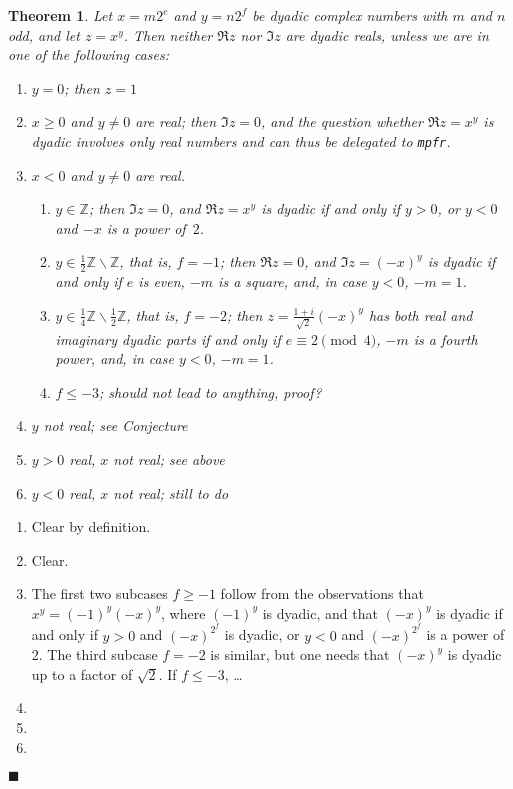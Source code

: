 \documentclass {article}
\newcommand {\mpfr}{{\tt mpfr}}
\newcommand {\Z}{\mathbb Z}
\newtheorem{theorem}{Theorem}
\newenvironment{proof}{\noindent{\bf Proof:}}{{\hspace* {\fill}$\blacksquare$}}
\begin{document}
\begin {theorem}
Let $x = m 2^e$ and $y = n 2^f$ be dyadic complex numbers with $m$ and $n$ odd,
and let $z = x^y$. Then neither $\Re z$ nor $\Im z$ are dyadic reals,
unless we are in one of the following cases:
\begin {enumerate}
\item
$y = 0$; then $z = 1$
\item
$x \geq 0$ and $y \neq 0$ are real; then $\Im z = 0$, and the question
whether $\Re z = x^y$ is dyadic involves only real numbers and
can thus be delegated to \mpfr.
\item
$x < 0$ and $y \neq 0$ are real.
\begin {enumerate}
\item
$y \in \Z$; then $\Im z = 0$, and $\Re z = x^y$ is dyadic if and only if
$y > 0$, or $y < 0$ and $-x$ is a power of~$2$.
\item
$y \in \frac {1}{2} \Z \backslash \Z$, that is, $f = -1$;
then $\Re z = 0$, and $\Im z = (-x)^y$ is dyadic if and only if
$e$ is even, $-m$ is a square, and, in case $y < 0$, $-m = 1$.
\item
$y \in \frac {1}{4} \Z \backslash \frac {1}{2} \Z$, that is, $f = -2$;
then $z = \frac {1 + i}{\sqrt 2} (-x)^y$ has both real and imaginary
dyadic parts if and only if
$e \equiv 2 \pmod 4$, $-m$ is a fourth power, and, in case $y < 0$, $-m = 1$.
\item
$f \leq -3$; should not lead to anything, proof?
\end {enumerate}
\item
$y$ not real;
see Conjecture
\item
$y > 0$ real, $x$ not real;
see above
\item
$y < 0$ real, $x$ not real;
still to do
\end {enumerate}
\end {theorem}

\begin {proof}
\begin {enumerate}
\item
Clear by definition.
\item
Clear.
\item
The first two subcases $f \geq -1$ follow from the observations that
$x^y = (-1)^y (-x)^y$, where $(-1)^y$ is dyadic, and that $(-x)^y$ is
dyadic if and only if $y > 0$ and $(-x)^{2^f}$ is dyadic, or
$y < 0$ and $(-x)^{2^f}$ is a power of~$2$.
The third subcase $f = -2$ is similar, but one needs that $(-x)^y$ is dyadic
up to a factor of $\sqrt 2$.
If $f \leq -3$, \ldots
\item
\item
\item
\end {enumerate}
\end {proof}





\end{document}
